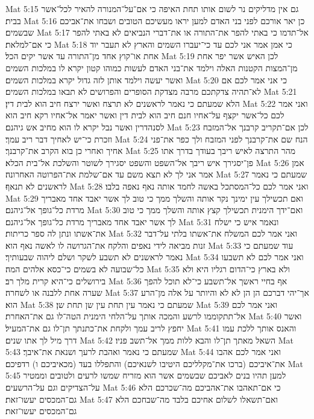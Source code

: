 Mat 5:15  גם אין מדליקים נר לשום אותו תחת האיפה כי אם־על־המנורה להאיר לכל־אשר בבית׃
Mat 5:16  כן יאר אורכם לפני בני האדם למען יראו מעשיכם הטובים ושבחו את־אביכם שבשמים׃
Mat 5:17  אל־תדמו כי באתי להפר את־התורה או את־דברי הנביאים לא באתי להפר כי אם־למלאת׃
Mat 5:18  כי אמן אמר אני לכם עד כי־יעברו השמים והארץ לא תעבר יוד אחת או־קוץ אחד מן־התורה עד אשר יקים הכל׃
Mat 5:19  לכן האיש אשר יפר אחת מן־המצות הקטנות האלה וילמד את־בני האדם לעשות כמוהו קטון יקרא לו במלכות השמים ואשר יעשה וילמד אותן לזה גדול יקרא במלכות השמים׃
Mat 5:20  כי אני אמר לכם אם לא־תהיה צדקתכם מרבה מצדקת הסופרים והפרושים לא תבאו במלכות השמים׃
Mat 5:21  הלא שמעתם כי נאמר לראשנים לא תרצח ואשר ירצח חיב הוא לבית דין׃
Mat 5:22  ואני אמר לכם כל־אשר יקצף על־אחיו חנם חיב הוא לבית דין ואשר יאמר אל־אחיו רקא חיב הוא לסנהדרין ואשר נבל יקרא לו הוא מחיב אש גיהנם׃
Mat 5:23  לכן אם־תקריב קרבנך אל־המזבח וזכרת כי־יש לאחיך דבר ריב עמך׃
Mat 5:24  הנח שם את־קרבנך לפני המזבח ולך כפר את־פני אחיך ואחרי כן בוא הקרב את־קרבנך׃
Mat 5:25  מהר התרצה לאיש ריבך בעודך בדרך אתו פן־יסגירך איש ריבך אל־השפט והשפט יסגירך לשוטר והשלכת אל־בית הכלא׃
Mat 5:26  אמן אמר אני לך לא תצא משם עד אם־שלמת את־הפרוטה האחרונה׃
Mat 5:27  שמעתם כי נאמר לראשנים לא תנאף׃
Mat 5:28  ואני אמר לכם כל־המסתכל באשה לחמד אותה נאף נאפה בלבו׃
Mat 5:29  ואם תכשילך עין ימינך נקר אותה והשלך ממך כי טוב לך אשר יאבד אחד מאבריך מרדת כל־גופך אל־גיהנם׃
Mat 5:30  ואם־ידך הימנית תכשילך קצץ אותה והשלך ממך כי טוב לך אשר יאבד אחד מאבריך מרדת כל־גופך אל־גיהנם׃
Mat 5:31  ונאמר איש כי ישלח את־אשתו ונתן לה ספר כריתות׃
Mat 5:32  ואני אמר לכם המשלח את־אשתו בלתי על־דבר זנות מביאה לידי נאפים והלקח את־הגרושה לו לאשה נאף הוא׃
Mat 5:33  עוד שמעתם כי נאמר לראשנים לא תשבע לשקר ושלם ליהוה שבעותיך׃
Mat 5:34  ואני אמר לכם לא תשבעו כל־שבועה לא בשמים כי־כסא אלהים המה׃
Mat 5:35  ולא בארץ כי־הדום רגליו היא ולא בירושלים כי־היא קרית מלך רב׃
Mat 5:36  אף בחיי ראשך אל־תשבע כי־לא תוכל להפך שערה אחת ללבנה או לשחרה׃
Mat 5:37  אך־יהי דברכם הן הן לא לא והיותר על אלה מן־הרע הוא׃
Mat 5:38  שמעתם כי נאמר עין תחת עין שן תחת שן׃
Mat 5:39  ואני אמר לכם אל־תתקוממו לרשע והמכה אותך על־הלחי הימנית הטה־לו גם את־האחרת׃
Mat 5:40  ואשר יחפץ לריב עמך ולקחת את־כתנתך תן־לו גם את־המעיל׃
Mat 5:41  והאנס אותך ללכת עמו דרך מיל לך אתו שנים׃
Mat 5:42  השאל מאתך תן־לו והבא ללות ממך אל־תשב פניו׃
Mat 5:43  שמעתם כי נאמר ואהבת לרעך ושנאת את־איבך׃
Mat 5:44  ואני אמר לכם אהבו את־איביכם (ברכו את־מקלליכם היטיבו לשנאיכם) והתפללו בעד (מכאיביכם ו) רדפיכם׃
Mat 5:45  למען תהיו בנים לאביכם שבשמים אשר הוא מזריח שמשו לרעים ולטובים וממטיר על־הצדיקים וגם על־הרשעים׃
Mat 5:46  כי אם־תאהבו את־אהביכם מה־שכרכם הלא גם־המכסים יעשו־זאת׃
Mat 5:47  ואם־תשאלו לשלום אחיכם בלבד מה־שבחכם הלא גם־המכסים יעשו־זאת׃

